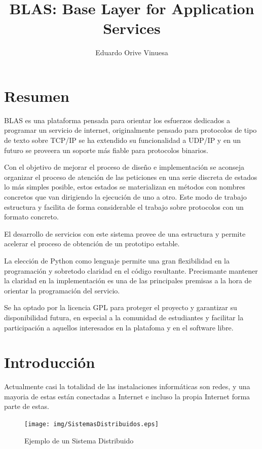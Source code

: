 \documentclass[a4paper,spanish,12pt]{book}
\title{BLAS: Base Layer for Application Services}
\author{Eduardo Orive Vinuesa}
\begin{document}

\cleardoublepage

\chapter*{Resumen}
BLAS es una plataforma pensada para orientar los esfuerzos dedicados a programar un servicio de internet, originalmente pensado para protocolos de tipo de texto sobre TCP/IP se ha extendido su funcionalidad a UDP/IP y en un futuro se proveera un soporte más fiable para protocolos binarios.

Con el objetivo de mejorar el proceso de diseño e implementación se aconseja organizar el proceso de atención de las peticiones en una serie discreta de estados lo más simples posible, estos estados se materializan en m\'etodos con nombres concretos que van dirigiendo la ejecución de uno a otro. Este modo de trabajo estructura y facilita de forma considerable el trabajo sobre protocolos con un formato concreto.

El desarrollo de servicios con este sistema provee de una estructura y permite acelerar el proceso de obtención de un prototipo estable.

La elección de Python como lenguaje permite una gran flexibilidad en la programación y sobretodo claridad en el código resultante. Precismante mantener la claridad en la implementación es una de las principales premisas a la hora de orientar la programación del servicio.

Se ha optado por la licencia GPL para proteger el proyecto y garantizar su disponibilidad futura, en especial a la comunidad de estudiantes y facilitar la participación a aquellos interesados en la platafoma y en el software libre.

\cleardoublepage


\pagestyle{plain}
\newpage
\tableofcontents
\newpage
\listoffigures
\cleardoublepage


\pagestyle{fancyplain}


\chapter{Introducción}
Actualmente casi la totalidad de las instalaciones inform\'aticas son redes, y una mayoria de estas est\'an conectadas a Internet e incluso la propia Internet forma parte de estas.
\begin{figure}[h] %
	\begin{center}
	\texttt{[image: img/SistemasDistribuidos.eps]}	
	\end{center}
	\caption{Ejemplo de un Sistema Distribuido}
	\label{fig:SistemasDistribuidos}
\end{figure}
\end{document}
